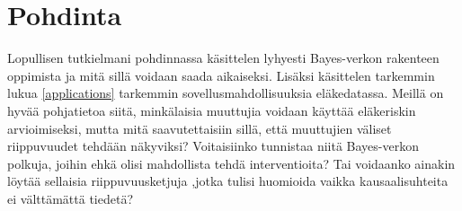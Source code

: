 \chapter{Pohdinta\label{conclusions}}
Lopullisen tutkielmani pohdinnassa käsittelen lyhyesti Bayes-verkon rakenteen oppimista ja mitä sillä voidaan saada aikaiseksi. Lisäksi käsittelen  tarkemmin lukua \ref{applications} tarkemmin sovellusmahdollisuuksia eläkedatassa. Meillä on hyvää pohjatietoa siitä, minkälaisia muuttujia voidaan käyttää eläkeriskin arvioimiseksi, mutta mitä saavutettaisiin sillä, että muuttujien väliset riippuvuudet tehdään näkyviksi? Voitaisiinko tunnistaa niitä Bayes-verkon polkuja, joihin ehkä olisi mahdollista tehdä interventioita? Tai voidaanko ainakin löytää sellaisia riippuvuusketjuja ,jotka tulisi huomioida vaikka kausaalisuhteita ei välttämättä tiedetä?

